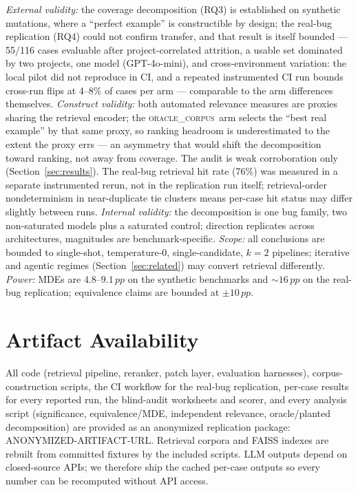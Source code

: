 \documentclass[10pt,conference]{IEEEtran}
\newcommand{\oraclecorpus}{\textsc{oracle\_corpus}\xspace}
\newcommand{\pp}{\,pp}
\begin{document}
\emph{External validity:} the coverage decomposition
(RQ3) is established on synthetic mutations, where a ``perfect example'' is
constructible by design; the real-bug replication (RQ4) could not confirm
transfer, and that result is itself bounded --- 55/116 cases evaluable
after project-correlated attrition, a usable set dominated by two projects,
one model (GPT-4o-mini), and cross-environment variation: the local pilot
did not reproduce in CI, and a repeated instrumented CI run bounds
cross-run flips at 4--8\% of cases per arm --- comparable to the arm
differences themselves. \emph{Construct validity:}
both automated relevance measures are proxies sharing the retrieval
encoder; the \oraclecorpus\ arm selects the ``best real example'' by that
same proxy, so ranking headroom is underestimated to the extent the proxy
errs --- an asymmetry that would shift the decomposition toward ranking,
not away from coverage. The audit is weak corroboration only
(Section~\ref{sec:results}). The real-bug retrieval hit rate (76\%) was
measured in a separate instrumented rerun, not in the replication run
itself; retrieval-order nondeterminism in near-duplicate tie clusters
means per-case hit status may differ slightly between runs.
\emph{Internal validity:} the decomposition is one bug family, two
non-saturated models plus a saturated control; direction replicates across
architectures, magnitudes are benchmark-specific. \emph{Scope:} all
conclusions are bounded to single-shot, temperature-0, single-candidate,
$k{=}2$ pipelines; iterative and agentic regimes
(Section~\ref{sec:related}) may convert retrieval differently.
\emph{Power:} MDEs are $4.8$--$9.1\pp$ on the synthetic benchmarks and
${\sim}16\pp$ on the real-bug replication; equivalence claims are bounded
at $\pm 10\pp$.

\section{Artifact Availability}
\label{sec:artifact}

All code (retrieval pipeline, reranker, patch layer, evaluation harnesses),
corpus-construction scripts, the CI workflow for the real-bug replication,
per-case results for every reported run, the blind-audit worksheets and
scorer, and every analysis script (significance, equivalence/MDE,
independent relevance, oracle/planted decomposition) are provided as an
anonymized replication package: ANONYMIZED-ARTIFACT-URL. Retrieval corpora
and FAISS indexes are rebuilt from committed fixtures by the included
scripts. LLM outputs depend on closed-source APIs; we therefore ship the
cached per-case outputs so every number can be recomputed without API
access.
\end{document}
